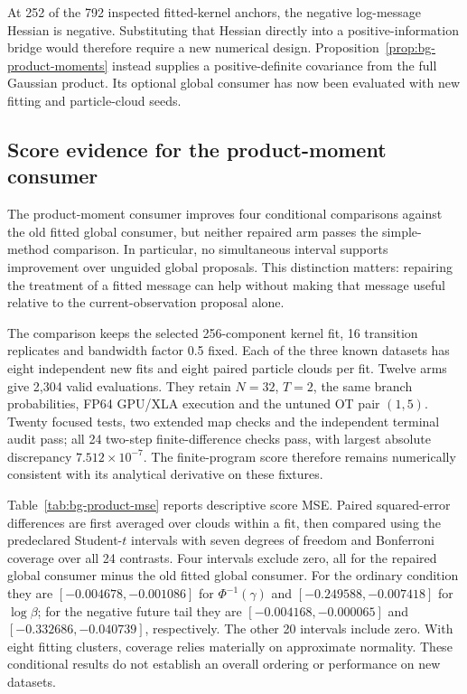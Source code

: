At 252 of the 792 inspected fitted-kernel anchors, the negative log-message
Hessian is negative. Substituting that Hessian directly into a
positive-information bridge would therefore require a new numerical design.
Proposition~\ref{prop:bg-product-moments} instead supplies a positive-definite
covariance from the full Gaussian product. Its optional global consumer has
now been evaluated with new fitting and particle-cloud seeds.

\subsection{Score evidence for the product-moment consumer}
\label{sec:bg-product-result}

The product-moment consumer improves four conditional comparisons against the
old fitted global consumer, but neither repaired arm passes the simple-method
comparison. In particular, no simultaneous interval supports improvement over
unguided global proposals. This distinction matters: repairing the treatment
of a fitted message can help without making that message useful relative to
the current-observation proposal alone.

The comparison keeps the selected 256-component kernel fit, 16 transition
replicates and bandwidth factor 0.5 fixed. Each of the three known datasets
has eight independent new fits and eight paired particle clouds per fit.
Twelve arms give 2,304 valid evaluations. They retain $N=32$, $T=2$, the
same branch probabilities, FP64 GPU/XLA execution and the untuned OT pair
$(1,5)$. Twenty focused tests, two extended map checks and the independent
terminal audit pass; all 24 two-step finite-difference checks pass, with
largest absolute discrepancy $7.512\times10^{-7}$. The finite-program score
therefore remains numerically consistent with its analytical derivative on
these fixtures.

Table~\ref{tab:bg-product-mse} reports descriptive score MSE. Paired
squared-error differences are first averaged over clouds within a fit, then
compared using the predeclared Student-$t$ intervals with seven degrees of
freedom and Bonferroni coverage over all 24 contrasts. Four intervals exclude
zero, all for the repaired global consumer minus the old fitted global
consumer. For the ordinary condition they are $[-0.004678,-0.001086]$ for
$\Phi^{-1}(\gamma)$ and $[-0.249588,-0.007418]$ for $\log\beta$; for the
negative future tail they are $[-0.004168,-0.000065]$ and
$[-0.332686,-0.040739]$, respectively. The other 20 intervals include zero.
With eight fitting clusters, coverage relies materially on approximate
normality. These conditional results do not establish an overall ordering or
performance on new datasets.

